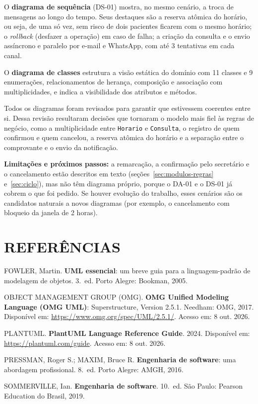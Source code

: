 \documentclass[12pt,a4paper]{article}
\begin{document}
O \textbf{diagrama de sequência} (DS-01) mostra, no mesmo cenário, a
troca de mensagens ao longo do tempo. Seus destaques são a reserva
atômica do horário, ou seja, de uma só vez, sem risco de dois pacientes
ficarem com o mesmo horário; o \emph{rollback} (desfazer a operação) em
caso de falha; a criação da consulta e o envio assíncrono e paralelo por
e-mail e WhatsApp, com até 3 tentativas em cada canal.

O \textbf{diagrama de classes} estrutura a visão estática do domínio com
11 classes e 9 enumerações, relacionamentos de herança, composição e
associação com multiplicidades, e indica a visibilidade dos atributos e
métodos.

Todos os diagramas foram revisados para garantir que estivessem
coerentes entre si. Dessa revisão resultaram decisões que tornaram o
modelo mais fiel às regras de negócio, como a multiplicidade entre
\texttt{Horario} e \texttt{Consulta}, o registro de quem confirmou e
quem cancelou, a reserva atômica do horário e a separação entre o
comprovante e o envio da notificação.

\textbf{Limitações e próximos passos:} a remarcação, a confirmação pelo
secretário e o cancelamento estão descritos em texto
(seções~\ref{sec:modulos-regras} e~\ref{sec:ciclo}), mas não têm
diagrama próprio, porque o DA-01 e o DS-01 já cobrem o que foi pedido.
Se houver evolução do trabalho, esses cenários são os candidatos
naturais a novos diagramas (por exemplo, o cancelamento com bloqueio da
janela de 2 horas).


\newpage
{}
{}
\section*{REFERÊNCIAS}

\begin{singlespace}
\setlength{\parindent}{0pt}
\setlength{\parskip}{1.5ex}

FOWLER, Martin. \textbf{UML essencial}: um breve guia para a linguagem-padrão de modelagem de objetos. 3.~ed. Porto Alegre: Bookman, 2005.

OBJECT MANAGEMENT GROUP (OMG). \textbf{OMG Unified Modeling Language (OMG UML)}: Superstructure, Version 2.5.1. Needham: OMG, 2017. Disponível em: \url{https://www.omg.org/spec/UML/2.5.1/}. Acesso em: 8 out. 2026.

PLANTUML. \textbf{PlantUML Language Reference Guide}. 2024. Disponível em: \url{https://plantuml.com/guide}. Acesso em: 8 out. 2026.

PRESSMAN, Roger S.; MAXIM, Bruce R. \textbf{Engenharia de software}: uma abordagem profissional. 8.~ed. Porto Alegre: AMGH, 2016.

SOMMERVILLE, Ian. \textbf{Engenharia de software}. 10.~ed. São Paulo: Pearson Education do Brasil, 2019.

\end{singlespace}
\end{document}
